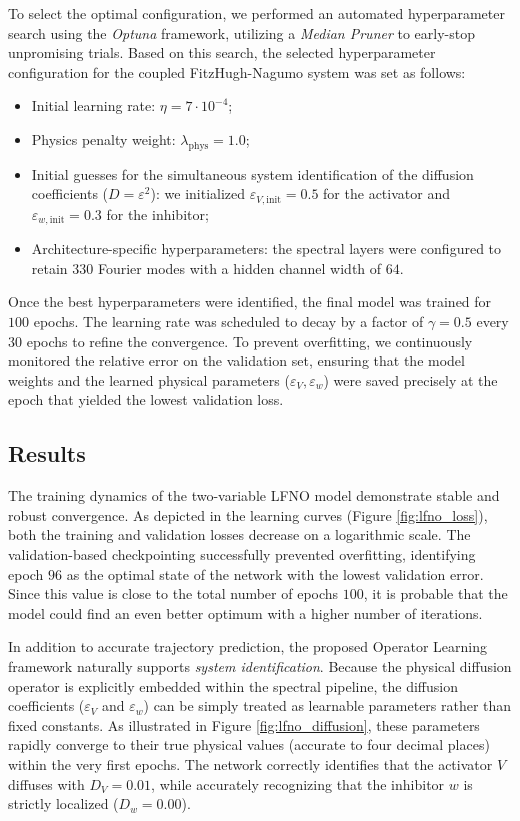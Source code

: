 To select the optimal configuration, we performed an automated hyperparameter search using the \textit{Optuna} framework, utilizing a \textit{Median Pruner} to early-stop unpromising trials. Based on this search, the selected hyperparameter configuration for the coupled FitzHugh-Nagumo system was set as follows:
\begin{itemize}
    \item Initial learning rate: $\eta = 7 \cdot 10^{-4}$;
    \item Physics penalty weight: $\lambda_{\text{phys}} = 1.0$;
    \item Initial guesses for the simultaneous system identification of the diffusion coefficients ($D = \varepsilon^2$): we initialized $\varepsilon_{V,\text{init}} = 0.5$ for the activator and $\varepsilon_{w,\text{init}} = 0.3$ for the inhibitor;
    \item Architecture-specific hyperparameters: the spectral layers were configured to retain $330$ Fourier modes with a hidden channel width of $64$.
\end{itemize}

Once the best hyperparameters were identified, the final model was trained for $100$ epochs. The learning rate was scheduled to decay by a factor of $\gamma = 0.5$ every $30$ epochs to refine the convergence. 
To prevent overfitting, we continuously monitored the relative error on the validation set, ensuring that the model weights and the learned physical parameters ($\varepsilon_V, \varepsilon_w$) were saved precisely at the epoch that yielded the lowest validation loss.



\subsection{Results}

The training dynamics of the two-variable LFNO model demonstrate stable and robust convergence. As depicted in the learning curves (Figure \ref{fig:lfno_loss}), both the training and validation losses decrease on a logarithmic scale. The validation-based checkpointing successfully prevented overfitting, identifying epoch $96$ as the optimal state of the network with the lowest validation error. Since this value is close to the total number of epochs $100$, it is probable that the model could find an even better optimum with a higher number of iterations.

In addition to accurate trajectory prediction, the proposed Operator Learning framework naturally supports \textit{system identification}. Because the physical diffusion operator is explicitly embedded within the spectral pipeline, the diffusion coefficients ($\varepsilon_V$ and $\varepsilon_w$) can be simply treated as learnable parameters rather than fixed constants. As illustrated in Figure \ref{fig:lfno_diffusion}, these parameters rapidly converge to their true physical values (accurate to four decimal places) within the very first epochs. The network correctly identifies that the activator $V$ diffuses with $D_V = 0.01$, while accurately recognizing that the inhibitor $w$ is strictly localized ($D_w = 0.00$).

